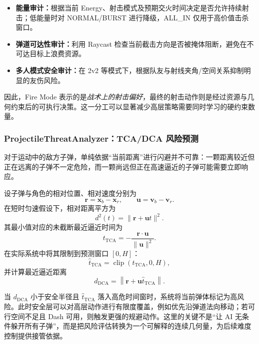 \documentclass[UTF8,a4paper,11pt]{ctexart}
\begin{document}
\begin{itemize}
    \item \textbf{能量审计：}根据当前 Energy、射击模式及预期交火时间决定是否允许持续射击；低能量时对 NORMAL/BURST 进行降级，ALL\_IN 仅用于高价值击杀窗口。
    \item \textbf{弹道可达性审计：}利用 Raycast 检查当前截击方向是否被掩体阻断，避免在不可达目标上浪费资源。
    \item \textbf{多人模式安全审计：}在 2v2 等模式下，根据队友与射线夹角/空间关系抑制明显的友伤风险。
\end{itemize}

因此，Fire Mode 表示的是\emph{战术上的射击偏好}，最终的射击动作则是经过资源与几何约束后的可执行决策。这一分工可以显著减少高层策略需要同时学习的硬约束数量。

\subsubsection{ProjectileThreatAnalyzer：TCA/DCA 风险预测}
对于运动中的敌方子弹，单纯依据“当前距离”进行闪避并不可靠：一颗距离较近但正在远离的子弹不一定危险，而一颗尚远但正在高速逼近的子弹可能需要立即响应。

设子弹与角色的相对位置、相对速度分别为
\begin{equation}
    \bm r=\bm x_b-\bm x_r,\qquad
    \bm u=\bm v_b-\bm v_r.
\end{equation}
在短时匀速假设下，相对距离平方为
\begin{equation}
    d^2(t)=\|\bm r+\bm u t\|^2.
\end{equation}
其最小值对应的未截断最近逼近时间为
\begin{equation}
    t_{\mathrm{TCA}}
    =-\frac{\bm r\cdot\bm u}{\|\bm u\|^2}.
\end{equation}
在实际系统中将其限制到预测窗口 $[0,H]$：
\begin{equation}
    \hat t_{\mathrm{TCA}}
    =\operatorname{clip}(t_{\mathrm{TCA}},0,H),
\end{equation}
并计算最近逼近距离
\begin{equation}
    d_{\mathrm{DCA}}
    =\left\|\bm r+\bm u\hat t_{\mathrm{TCA}}\right\|.
\end{equation}

当 $d_{\mathrm{DCA}}$ 小于安全半径且 $\hat t_{\mathrm{TCA}}$ 落入高危时间窗时，系统将当前弹体标记为高风险。此时安全层可以对高层动作进行有限度覆盖，例如优先沿弹道法向移动；若可行空间不足且 Dash 可用，则触发更强的规避动作。这里的关键不是“让 AI 无条件躲开所有子弹”，而是把风险评估转换为一个可解释的连续几何量，为后续难度控制提供接管依据。
\end{document}
